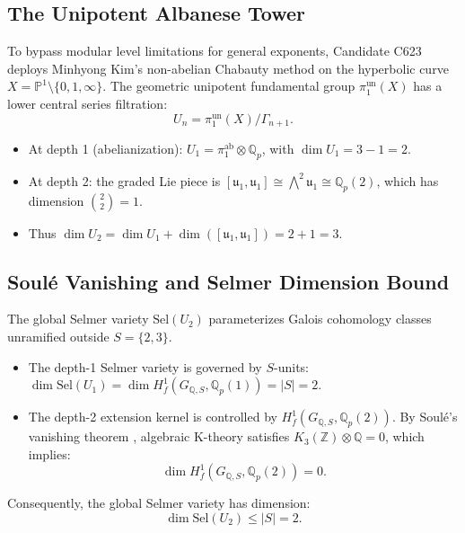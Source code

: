\documentclass[11pt,reqno]{amsart}
\theoremstyle{definition}
\theoremstyle{remark}
\numberwithin{equation}{section}
\begin{document}
\subsection{The Unipotent Albanese Tower}
To bypass modular level limitations for general exponents, Candidate C623 deploys Minhyong Kim's non-abelian Chabauty method \cite{Kim2010} on the hyperbolic curve $X = \mathbb{P}^1 \setminus \{0, 1, \infty\}$. The geometric unipotent fundamental group $\pi_1^{\mathrm{un}}(X)$ has a lower central series filtration:
\begin{equation}
U_n = \pi_1^{\mathrm{un}}(X) / \Gamma_{n+1}.
\end{equation}
\begin{itemize}
    \item At depth 1 (abelianization): $U_1 = \pi_1^{\mathrm{ab}} \otimes \mathbb{Q}_p$, with $\dim U_1 = 3 - 1 = 2$.
    \item At depth 2: the graded Lie piece is $[\mathfrak{u}_1, \mathfrak{u}_1] \cong \bigwedge^2 \mathfrak{u}_1 \cong \mathbb{Q}_p(2)$, which has dimension $\binom{2}{2} = 1$.
    \item Thus $\dim U_2 = \dim U_1 + \dim([\mathfrak{u}_1, \mathfrak{u}_1]) = 2 + 1 = 3$.
\end{itemize}

\subsection{Soul\'{e} Vanishing and Selmer Dimension Bound}
The global Selmer variety $\mathrm{Sel}(U_2)$ parameterizes Galois cohomology classes unramified outside $S = \{2, 3\}$.
\begin{itemize}
    \item The depth-1 Selmer variety is governed by $S$-units: $\dim \mathrm{Sel}(U_1) = \dim H^1_f(G_{\mathbb{Q}, S}, \mathbb{Q}_p(1)) = |S| = 2$.
    \item The depth-2 extension kernel is controlled by $H^1_f(G_{\mathbb{Q}, S}, \mathbb{Q}_p(2))$. By Soul\'{e}'s vanishing theorem \cite{Soule1979}, algebraic K-theory satisfies $K_3(\mathbb{Z}) \otimes \mathbb{Q} = 0$, which implies:
    \begin{equation}
    \dim H^1_f(G_{\mathbb{Q}, S}, \mathbb{Q}_p(2)) = 0.
    \end{equation}
\end{itemize}
Consequently, the global Selmer variety has dimension:
\begin{equation}
\dim \mathrm{Sel}(U_2) \le |S| = 2.
\end{equation}
\end{document}
